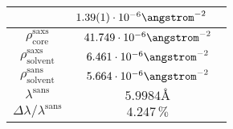 \documentclass[\main/dresen_thesis.tex]{subfiles}
\begin{document}
\begin{table}[h]
\begin{tabular}{ c | l | l }
      & $1.39(1) \cdot 10^{-6} \angstrom^{-2}$\\
    \hline
    $\rho_\mathrm{core}^\mathrm{saxs}$
      & \multicolumn{2}{c}{$41.749 \cdot 10^{-6} \angstrom^{-2}$}\\
    $\rho_\mathrm{solvent}^\mathrm{saxs}$
      & \multicolumn{2}{c}{$6.461 \cdot 10^{-6} \angstrom^{-2}$}\\
    $\rho_\mathrm{solvent}^\mathrm{sans}$
      & \multicolumn{2}{c}{$5.664 \cdot 10^{-6} \angstrom^{-2}$}\\
    $\lambda^\mathrm{sans}$
      & \multicolumn{2}{c}{$5.9984 \unit{\angstrom}$}\\
    $\Delta \lambda / \lambda ^\mathrm{sans}$
      & \multicolumn{2}{c}{$4.247 \, \%$}\\
    \hline
  \end{tabular}
\end{table}
\end{document}
